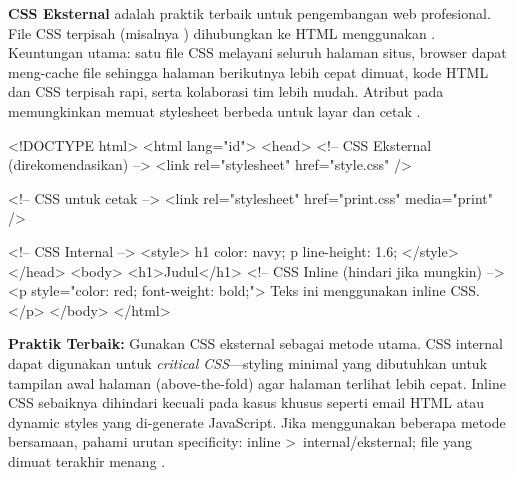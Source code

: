 \textbf{CSS Eksternal} adalah praktik terbaik untuk pengembangan web profesional. File CSS terpisah (misalnya ) dihubungkan ke HTML menggunakan . Keuntungan utama: satu file CSS melayani seluruh halaman situs, browser dapat meng-cache file sehingga halaman berikutnya lebih cepat dimuat, kode HTML dan CSS terpisah rapi, serta kolaborasi tim lebih mudah. Atribut  pada  memungkinkan memuat stylesheet berbeda untuk layar dan cetak \cite{cssTricks}.

\begin{webcode}[language=HTML, caption={Tiga cara menyisipkan CSS}]
<!DOCTYPE html>
<html lang="id">
<head>
  <!-- CSS Eksternal (direkomendasikan) -->
  <link rel="stylesheet" href="style.css" />

  <!-- CSS untuk cetak -->
  <link rel="stylesheet" href="print.css"
        media="print" />

  <!-- CSS Internal -->
  <style>
    h1 { color: navy; }
    p  { line-height: 1.6; }
  </style>
</head>
<body>
  <h1>Judul</h1>
  <!-- CSS Inline (hindari jika mungkin) -->
  <p style="color: red; font-weight: bold;">
    Teks ini menggunakan inline CSS.
  </p>
</body>
</html>
\end{webcode}

\begin{catatan}
\textbf{Praktik Terbaik:} Gunakan CSS eksternal sebagai metode utama. CSS internal dapat digunakan untuk \textit{critical CSS}---styling minimal yang dibutuhkan untuk tampilan awal halaman (above-the-fold) agar halaman terlihat lebih cepat. Inline CSS sebaiknya dihindari kecuali pada kasus khusus seperti email HTML atau dynamic styles yang di-generate JavaScript. Jika menggunakan beberapa metode bersamaan, pahami urutan specificity: inline \textgreater\ internal/eksternal; file yang dimuat terakhir menang \cite{webdevCss}.
\end{catatan}

